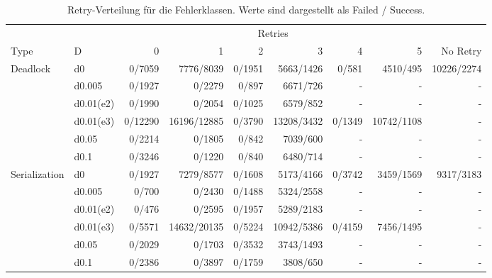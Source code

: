 \begin{table}[htbp]
	\centering
	\caption{Retry-Verteilung für die Fehlerklassen.
	Werte sind dargestellt als Failed / Success.}
	\label{tab:d-retryDistribution}
	\footnotesize
	\setlength{\tabcolsep}{3pt}

	\begin{tabular}{llrrrrrrr}
		\toprule
		& & \multicolumn{6}{c}{Retries} & \\
		Type & D & 0 & 1 & 2 & 3 & 4 & 5 & No Retry \\
		\midrule

		\multirow{5}{*}{Deadlock}
		& d0
		& 0/7059 & 7776/8039 & 0/1951
		& 5663/1426 & 0/581 & 4510/495
		& 10226/2274 \\

		& d0.005
		& 0/1927 & 0/2279 & 0/897
		& 6671/726 & - & -
		& - \\

		& d0.01(e2)
		& 0/1990 & 0/2054 & 0/1025
		& 6579/852 & - & -
		& - \\

		& d0.01(e3)
		& 0/12290 & 16196/12885 & 0/3790
		& 13208/3432 & 0/1349 & 10742/1108
		& - \\

		& d0.05
		& 0/2214 & 0/1805 & 0/842
		& 7039/600 & - & -
		& - \\

		& d0.1
		& 0/3246 & 0/1220 & 0/840
		& 6480/714 & - & -
		& - \\

		\midrule

		\multirow{5}{*}{Serialization}
		& d0
		& 0/1927 & 7279/8577 & 0/1608
		& 5173/4166 & 0/3742 & 3459/1569
		& 9317/3183 \\

		& d0.005
		& 0/700 & 0/2430 & 0/1488
		& 5324/2558 & - & -
		& - \\

		& d0.01(e2)
		& 0/476 & 0/2595 & 0/1957
		& 5289/2183 & - & -
		& - \\

		& d0.01(e3)
		& 0/5571 & 14632/20135 & 0/5224
		& 10942/5386 & 0/4159 & 7456/1495
		& - \\

		& d0.05
		& 0/2029 & 0/1703 & 0/3532
		& 3743/1493 & - & -
		& - \\

		& d0.1
		& 0/2386 & 0/3897 & 0/1759
		& 3808/650 & - & -
		& - \\

		\midrule


\end{tabular}
\end{table}
